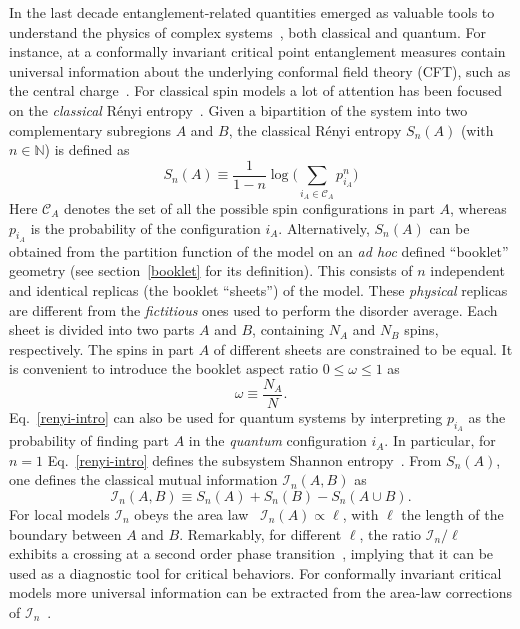 \documentclass[twocolumn,superscriptaddress,prb,10pt]{revtex4-1}
\begin{document}
In the last decade entanglement-related quantities emerged as valuable tools to 
understand the physics of complex systems~\cite{amico-2008,eisert-2009,calabrese-2009,
cc-rev}, both classical and quantum. For instance, at a conformally invariant critical 
point entanglement measures contain universal information about the underlying 
conformal field theory (CFT), such as the central charge~\cite{holzhey-1994,vidal-2003,
calabrese-2004,calabrese-2012}. For classical spin models a lot of attention has been 
focused on the \emph{classical} R\'enyi entropy~\cite{jaconis-2013,stephan-2014}. Given 
a bipartition of the system into two complementary subregions $A$ and $B$, the classical 
R\'enyi entropy $S_n(A)$ (with $n\in\mathbb{N}$) is defined as 
%
\begin{equation}
S_n(A)\equiv \frac{1}{1-n}\log\Big(\sum\limits_{i_A\in{\mathcal C}_A} p^n_{i_A}
\Big)
\label{renyi-intro}
\end{equation}
%
Here ${\mathcal C}_A$ denotes the set of all the possible spin configurations in part 
$A$, whereas $p_{i_A}$ is the probability of the configuration $i_A$. 
Alternatively, $S_n(A)$ can be obtained from the partition function of the model on 
an \emph{ad hoc} defined ``booklet'' geometry (see section~\ref{booklet} for its 
definition). This consists of $n$ independent and identical replicas (the 
booklet ``sheets'') of the model. These \emph{physical} replicas are different 
from the \emph{fictitious} ones used to perform the disorder average. Each sheet is 
divided into two parts $A$ and $B$, containing $N_A$ and $N_B$ spins, respectively. 
The spins in part $A$ of different sheets are constrained to be equal. It is 
convenient to introduce the booklet aspect ratio $0\le\omega\le1$ as  
%
\begin{equation}
\label{a-ratio}
\omega\equiv \frac{N_A}{N}.
\end{equation}
%
Eq.~\eqref{renyi-intro} can also be used for quantum systems by interpreting $p_{i_A}$ as 
the probability of finding part $A$ in the \emph{quantum} configuration $i_A$. In particular, 
for $n=1$ Eq.~\eqref{renyi-intro} defines the subsystem Shannon entropy~\cite{alcaraz-2013,
stephan-2014-a}. From $S_n(A)$, one defines the classical mutual information 
${\mathcal I}_n(A,B)$ as 
%
\begin{equation}
{\mathcal I}_n(A,B)\equiv S_n(A)+S_n(B)-S_n(A\cup B). 
\end{equation}
%
For local models ${\mathcal I}_n$ obeys the area law~\cite{wolf-2008} ${\mathcal I}_n(A)
\propto\ell$, with $\ell$ the length of the boundary between $A$ and $B$. Remarkably, 
for different $\ell$, the ratio ${\mathcal I}_n/\ell$ exhibits a crossing at a second 
order phase transition~\cite{jaconis-2013}, implying that it can be used as a diagnostic 
tool for critical behaviors. For conformally invariant critical models more universal 
information can be extracted from the area-law corrections of ${\mathcal I}_n$~\cite{stephan-2014}. 
\end{document}
